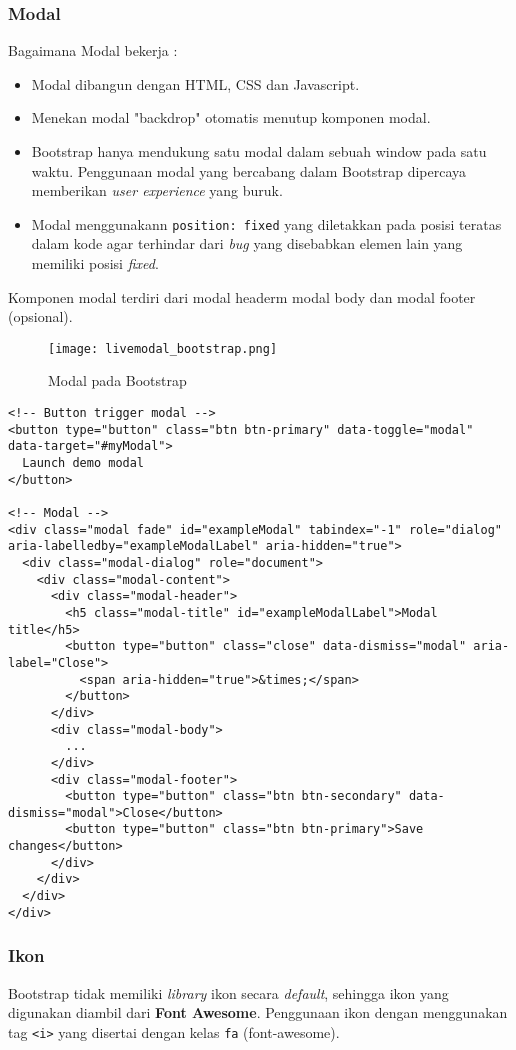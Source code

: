 \subsubsection{Modal}
Bagaimana Modal bekerja :
\begin{itemize}
\item Modal dibangun dengan HTML, CSS dan Javascript. 
\item Menekan modal "backdrop" otomatis menutup komponen modal.
\item Bootstrap hanya mendukung satu modal dalam sebuah window pada satu waktu. Penggunaan modal yang bercabang dalam Bootstrap dipercaya memberikan \textit{user experience} yang buruk.
\item Modal menggunakann \texttt{position: fixed} yang diletakkan pada posisi teratas dalam kode agar terhindar dari \textit{bug} yang disebabkan elemen lain yang memiliki posisi \textit{fixed}. 
\end{itemize}
Komponen modal terdiri dari modal headerm modal body dan modal footer (opsional).
\begin{figure} [H]
	\centering  
	\texttt{[image: livemodal\_bootstrap.png]}  
	\caption{Modal pada Bootstrap} 
\end{figure}
\begin{lstlisting}[frame=single, basicstyle=\tiny] 
<!-- Button trigger modal -->
<button type="button" class="btn btn-primary" data-toggle="modal" data-target="#myModal">
  Launch demo modal
</button>

<!-- Modal -->
<div class="modal fade" id="exampleModal" tabindex="-1" role="dialog" 
aria-labelledby="exampleModalLabel" aria-hidden="true">
  <div class="modal-dialog" role="document">
    <div class="modal-content">
      <div class="modal-header">
        <h5 class="modal-title" id="exampleModalLabel">Modal title</h5>
        <button type="button" class="close" data-dismiss="modal" aria-label="Close">
          <span aria-hidden="true">&times;</span>
        </button>
      </div>
      <div class="modal-body">
        ...
      </div>
      <div class="modal-footer">
        <button type="button" class="btn btn-secondary" data-dismiss="modal">Close</button>
        <button type="button" class="btn btn-primary">Save changes</button>
      </div>
    </div>
  </div>
</div>
\end{lstlisting}

\subsubsection{Ikon}
Bootstrap tidak memiliki \textit{library} ikon secara \textit{default}, sehingga ikon yang digunakan diambil dari \textbf{Font Awesome}. Penggunaan ikon dengan menggunakan tag \texttt{<i>} yang disertai dengan kelas \texttt{fa} (font-awesome). 

